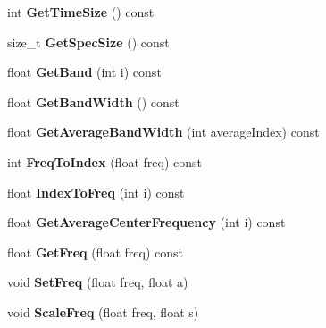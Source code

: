 \begin{DoxyCompactItemize}
int {\bfseries Get\+Time\+Size} () const
\item 
\mbox{\label{class_i_fourier_transform_ab0271eeca32a5ced68f43993f6894fd2}} 
size\+\_\+t {\bfseries Get\+Spec\+Size} () const
\item 
\mbox{\label{class_i_fourier_transform_aef88c3b8a115bf9f5eb43d31963c77a5}} 
float {\bfseries Get\+Band} (int i) const
\item 
\mbox{\label{class_i_fourier_transform_aec51b2699f06114e75da87282d404d8d}} 
float {\bfseries Get\+Band\+Width} () const
\item 
\mbox{\label{class_i_fourier_transform_a58be0d9da15e4e6f27c8e285c8766148}} 
float {\bfseries Get\+Average\+Band\+Width} (int average\+Index) const
\item 
\mbox{\label{class_i_fourier_transform_a79891012dfb2e443253d97fa165aa3dd}} 
int {\bfseries Freq\+To\+Index} (float freq) const
\item 
\mbox{\label{class_i_fourier_transform_a5103d0538993068538c940679712cc99}} 
float {\bfseries Index\+To\+Freq} (int i) const
\item 
\mbox{\label{class_i_fourier_transform_adb8afcae93b0789416ddf3c794f1c070}} 
float {\bfseries Get\+Average\+Center\+Frequency} (int i) const
\item 
\mbox{\label{class_i_fourier_transform_ad9cdb0ecf1b47eb9fc01a1aef6e9ec3d}} 
float {\bfseries Get\+Freq} (float freq) const
\item 
\mbox{\label{class_i_fourier_transform_a34f8bca2225bea18952c406a1f90bf36}} 
void {\bfseries Set\+Freq} (float freq, float a)
\item 
\mbox{\label{class_i_fourier_transform_a76ac3d5d5d027431fab1b58044bceacc}} 
void {\bfseries Scale\+Freq} (float freq, float s)
\item 
\mbox{\label{class_i_fourier_transform_a97fb645c2c0e909f82c14b61509f3348}} 

\end{DoxyCompactItemize}
